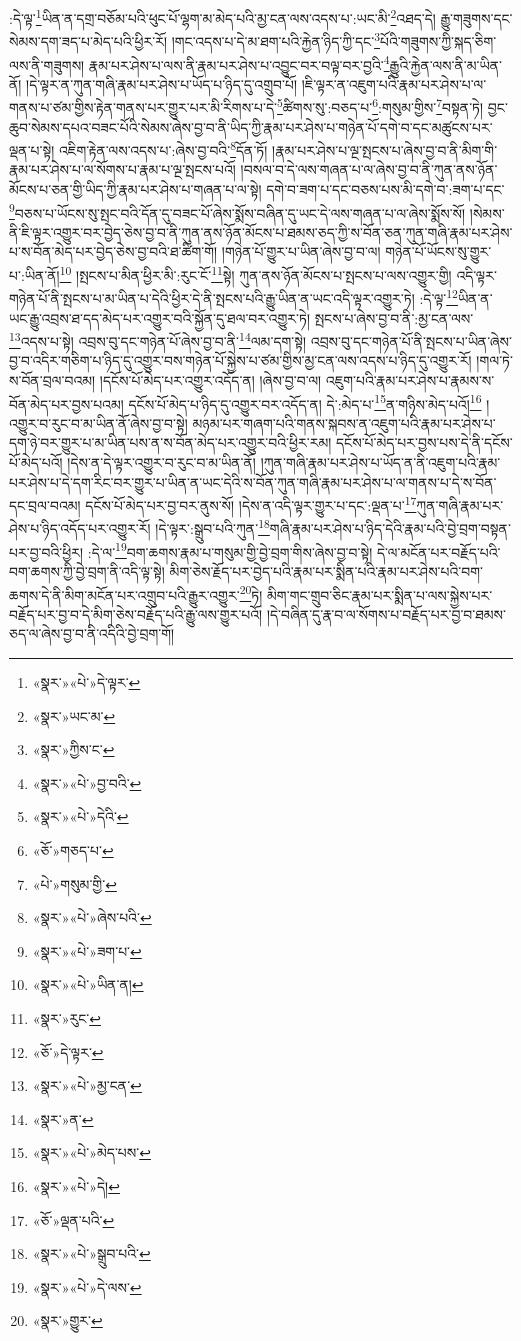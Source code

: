 :དེ་ལྟ་\footnote{«སྣར་»«པེ་»དེ་ལྟར་}ཡིན་ན་དགྲ་བཅོམ་པའི་ཕུང་པོ་ལྷག་མ་མེད་པའི་མྱ་ངན་ལས་འདས་པ་:ཡང་མི་\footnote{«སྣར་»ཡང་མ་}འཐད་དེ། རྒྱུ་གཟུགས་དང་སེམས་དག་ཟད་པ་མེད་པའི་ཕྱིར་རོ། །གང་འདས་པ་དེ་མ་ཐག་པའི་རྐྱེན་ཉིད་ཀྱི་དང་\footnote{«སྣར་»ཀྱིས་ང་}པོའི་གཟུགས་ཀྱི་སྐད་ཅིག་ལས་ནི་གཟུགས། རྣམ་པར་ཤེས་པ་ལས་ནི་རྣམ་པར་ཤེས་པ་འབྱུང་བར་བལྟ་བར་བྱའི་\footnote{«སྣར་»«པེ་»བྱ་བའི་}རྒྱུའི་རྐྱེན་ལས་ནི་མ་ཡིན་ནོ། །དེ་ལྟར་ན་ཀུན་གཞི་རྣམ་པར་ཤེས་པ་ཡོད་པ་ཉིད་དུ་འགྲུབ་པོ། །ཇི་ལྟར་ན་འཇུག་པའི་རྣམ་པར་ཤེས་པ་ལ་གནས་པ་ཙམ་གྱིས་རྟེན་གནས་པར་གྱུར་པར་མི་རིགས་པ་དེ་\footnote{«སྣར་»«པེ་»དེའི་}ཚིགས་སུ་:བཅད་པ་\footnote{«ཅོ་»གཅད་པ་}:གསུམ་གྱིས་\footnote{«པེ་»གསུམ་གྱི་}བསྟན་ཏེ། བྱང་ཆུབ་སེམས་དཔའ་བཟང་པོའི་སེམས་ཞེས་བྱ་བ་ནི་ཡིད་ཀྱི་རྣམ་པར་ཤེས་པ་གཉེན་པོ་དགེ་བ་དང་མཚུངས་པར་ལྡན་པ་སྟེ། འཇིག་རྟེན་ལས་འདས་པ་:ཞེས་བྱ་བའི་\footnote{«སྣར་»«པེ་»ཞེས་པའི་}དོན་ཏོ། །རྣམ་པར་ཤེས་པ་ལྔ་སྤངས་པ་ཞེས་བྱ་བ་ནི་མིག་གི་རྣམ་པར་ཤེས་པ་ལ་སོགས་པ་རྣམ་པ་ལྔ་སྤངས་པའོ། །བསལ་བ་དེ་ལས་གཞན་པ་ལ་ཞེས་བྱ་བ་ནི་ཀུན་ནས་ཉོན་མོངས་པ་ཅན་གྱི་ཡིད་ཀྱི་རྣམ་པར་ཤེས་པ་གཞན་པ་ལ་སྟེ། དགེ་བ་ཟག་པ་དང་བཅས་པས་མི་དགེ་བ་:ཟག་པ་དང་\footnote{«སྣར་»«པེ་»ཟག་པ་}བཅས་པ་ཡོངས་སུ་སྤང་བའི་དོན་དུ་བཟང་པོ་ཞེས་སྨོས་བཞིན་དུ་ཡང་དེ་ལས་གཞན་པ་ལ་ཞེས་སྨོས་སོ། །སེམས་ནི་ཇི་ལྟར་འགྱུར་བར་བྱེད་ཅེས་བྱ་བ་ནི་ཀུན་ནས་ཉོན་མོངས་པ་ཐམས་ཅད་ཀྱི་ས་བོན་ཅན་ཀུན་གཞི་རྣམ་པར་ཤེས་པ་ས་བོན་མེད་པར་བྱེད་ཅེས་བྱ་བའི་ཐ་ཚིག་གོ། །གཉེན་པོ་གྱུར་པ་ཡིན་ཞེས་བྱ་བ་ལ། གཉེན་པོ་ཡོངས་སུ་གྱུར་པ་:ཡིན་ནོ།\footnote{«སྣར་»«པེ་»ཡིན་ན།} །སྤངས་པ་མིན་ཕྱིར་མི་:རུང་ངོ་\footnote{«སྣར་»རུང་}སྟེ། ཀུན་ནས་ཉོན་མོངས་པ་སྤངས་པ་ལས་འགྱུར་གྱི། འདི་ལྟར་གཉེན་པོ་ནི་སྤངས་པ་མ་ཡིན་པ་དེའི་ཕྱིར་དེ་ནི་སྤངས་པའི་རྒྱུ་ཡིན་ན་ཡང་འདི་ལྟར་འགྱུར་ཏེ། :དེ་ལྟ་\footnote{«ཅོ་»དེ་ལྟར་}ཡིན་ན་ཡང་རྒྱུ་འབྲས་ཐ་དད་མེད་པར་འགྱུར་བའི་སྐྱོན་དུ་ཐལ་བར་འགྱུར་ཏེ། སྤངས་པ་ཞེས་བྱ་བ་ནི་:མྱ་ངན་ལས་\footnote{«སྣར་»«པེ་»མྱ་ངན་}འདས་པ་སྟེ། འབྲས་བུ་དང་གཉེན་པོ་ཞེས་བྱ་བ་ནི་\footnote{«སྣར་»ན་}ལམ་དག་སྟེ། འབྲས་བུ་དང་གཉེན་པོ་ནི་སྤངས་པ་ཡིན་ཞེས་བྱ་བ་འདིར་གཅིག་པ་ཉིད་དུ་འགྱུར་བས་གཉེན་པོ་སྐྱེས་པ་ཙམ་གྱིས་མྱ་ངན་ལས་འདས་པ་ཉིད་དུ་འགྱུར་རོ། །གལ་ཏེ་ས་བོན་བྲལ་བའམ། །དངོས་པོ་མེད་པར་འགྱུར་འདོད་ན། །ཞེས་བྱ་བ་ལ། འཇུག་པའི་རྣམ་པར་ཤེས་པ་རྣམས་ས་བོན་མེད་པར་བྱས་པའམ། དངོས་པོ་མེད་པ་ཉིད་དུ་འགྱུར་བར་འདོད་ན། དེ་:མེད་པ་\footnote{«སྣར་»«པེ་»མེད་པས་}ན་གཉིས་མེད་པའོ།\footnote{«སྣར་»«པེ་»དེ།} །འགྱུར་བ་རུང་བ་མ་ཡིན་ནོ་ཞེས་བྱ་བ་སྟེ། མཉམ་པར་གཞག་པའི་གནས་སྐབས་ན་འཇུག་པའི་རྣམ་པར་ཤེས་པ་དག་ཉེ་བར་གྱུར་པ་མ་ཡིན་པས་ན་ས་བོན་མེད་པར་འགྱུར་བའི་ཕྱིར་རམ། དངོས་པོ་མེད་པར་བྱས་པས་དེ་ནི་དངོས་པོ་མེད་པའོ། །དེས་ན་དེ་ལྟར་འགྱུར་བ་རུང་བ་མ་ཡིན་ནོ། །ཀུན་གཞི་རྣམ་པར་ཤེས་པ་ཡོད་ན་ནི་འཇུག་པའི་རྣམ་པར་ཤེས་པ་དེ་དག་རིང་བར་གྱུར་པ་ཡིན་ན་ཡང་དེའི་ས་བོན་ཀུན་གཞི་རྣམ་པར་ཤེས་པ་ལ་གནས་པ་དེ་ས་བོན་དང་བྲལ་བའམ། དངོས་པོ་མེད་པར་བྱ་བར་ནུས་སོ། །དེས་ན་འདི་ལྟར་གྱུར་པ་དང་:ལྡན་པ་\footnote{«ཅོ་»ལྡན་པའི་}ཀུན་གཞི་རྣམ་པར་ཤེས་པ་ཉིད་འདོད་པར་འགྱུར་རོ། །དེ་ལྟར་:སྒྲུབ་པའི་ཀུན་\footnote{«སྣར་»«པེ་»སྒྲུབ་པའི་}གཞི་རྣམ་པར་ཤེས་པ་ཉིད་དེའི་རྣམ་པའི་བྱེ་བྲག་བསྟན་པར་བྱ་བའི་ཕྱིར། :དེ་ལ་\footnote{«སྣར་»«པེ་»དེ་ལས་}བག་ཆགས་རྣམ་པ་གསུམ་གྱི་བྱེ་བྲག་གིས་ཞེས་བྱ་བ་སྟེ། དེ་ལ་མངོན་པར་བརྗོད་པའི་བག་ཆགས་ཀྱི་བྱེ་བྲག་ནི་འདི་ལྟ་སྟེ། མིག་ཅེས་རྗོད་པར་བྱེད་པའི་རྣམ་པར་སྨིན་པའི་རྣམ་པར་ཤེས་པའི་བག་ཆགས་དེ་ནི་མིག་མངོན་པར་འགྲུབ་པའི་རྒྱུར་འགྱུར་\footnote{«སྣར་»གྱུར་}ཏེ། མིག་གང་གྲུབ་ཅིང་རྣམ་པར་སྨིན་པ་ལས་སྐྱེས་པར་བརྗོད་པར་བྱ་བ་དེ་མིག་ཅེས་བརྗོད་པའི་རྒྱུ་ལས་གྱུར་པའོ། །དེ་བཞིན་དུ་རྣ་བ་ལ་སོགས་པ་བརྗོད་པར་བྱ་བ་ཐམས་ཅད་ལ་ཞེས་བྱ་བ་ནི་འདིའི་བྱེ་བྲག་གོ། 